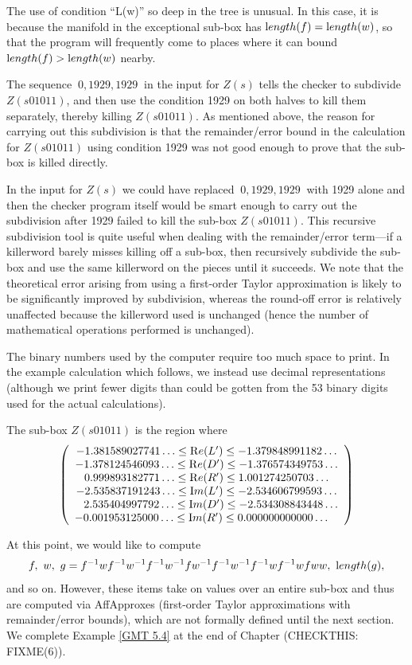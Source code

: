 \begin{example}
The use of condition ``L(w)'' so deep in the tree is unusual.
In this case, it is because the manifold in the exceptional sub-box
has ${\textrm length}(f) = {\textrm length}(w)$, so that the program will frequently
come to places where it can bound ${\textrm length}(f) > {\textrm length}(w)$ nearby.

The sequence $\ 0, 1929, 1929\ $ in the 
input for $Z(s)$ tells the checker to
subdivide $Z(s01011)$, and then use the condition 1929
on both halves to kill   them separately, 
thereby killing $Z(s01011)$.
As mentioned above,
the reason for carrying out this  subdivision 
is that the remainder/error bound in the calculation
 for $Z(s01011)$ using condition 1929 was not good enough
to prove that the sub-box is killed directly. 
 
 


In the input for $Z(s)$ we could have
replaced 
 $\ 0, 1929, 1929\ $ with 1929 alone
and then the checker
program itself would be smart enough to carry out
the subdivision after 1929 failed to kill the sub-box
$Z(s01011).$
This recursive subdivision tool is quite useful when dealing with the 
remainder/error term---if a killerword barely misses killing off a sub-box, then recursively subdivide the sub-box and
use the same killerword on the pieces until it succeeds.   We note that the theoretical error arising from using a
first-order Taylor approximation is likely to be significantly improved by subdivision, whereas the
round-off error is relatively unaffected because the killerword
used is unchanged (hence the number of mathematical operations
performed is unchanged).

The binary numbers used by the computer require too much space to print.
In the example calculation which follows, we instead use decimal 
representations (although we print fewer digits than could
be gotten from the 53 binary digits used for the actual calculations).

The sub-box $Z(s01011)$ is the region where 
$$\left(\begin{array}{c} 
-1.381589027741\ldots  \le  {\mathrm Re}(L')  \le  -1.379848991182\ldots\cr
-1.378124546093\ldots  \le  {\mathrm Re}(D')  \le  -1.376574349753\ldots\cr
0.999893182771\ldots  \le {\mathrm Re}(R')  \le  1.001274250703\ldots\cr
-2.535837191243\ldots  \le  {\mathrm Im}(L')  \le  -2.534606799593\ldots\cr
\phantom{-}2.535404997792\ldots  \le  {\mathrm Im}(D')  \le  -2.534308843448\ldots\cr
-0.001953125000\ldots  \le  {\mathrm Im}(R')  \le  0.000000000000\ldots\phantom{-}\cr
\end{array}\right)$$


At this point, we would like to compute $$f,\ w,\ g = f^{-1}wf^{-1}w^{-1}f^{-1}w^{-1}fw^{-1}f^{-1}w^{-1}f^{-1}wf^{-1}wfww, \ {\textrm length}(g),$$ 
\noindent 
and so on.  
However, these items take on values over an entire sub-box and thus are computed via AffApproxes (first-order Taylor
approximations with remainder/error bounds), which are not formally defined until the next section.  We
complete
Example \ref{GMT 5.4}
 at the end of 
Chapter (CHECKTHIS: FIXME(6)).\end{example}

